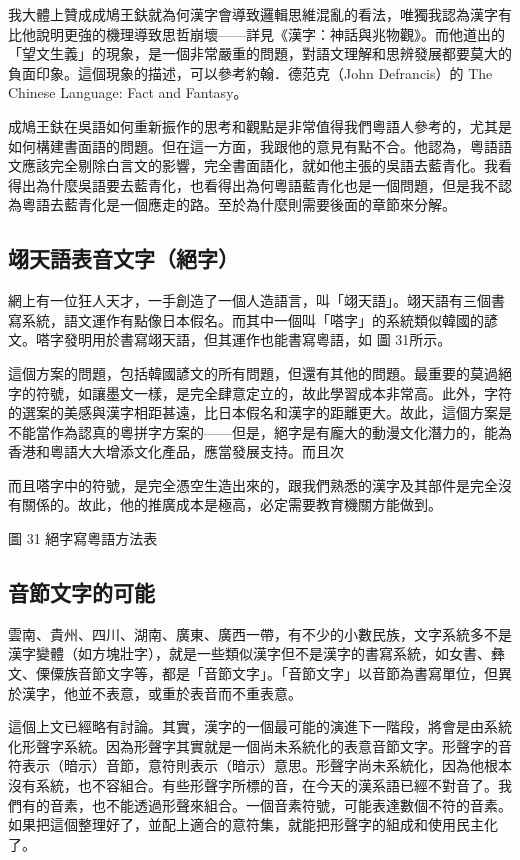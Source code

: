\documentclass[a5paper, 12pt, openany]{book} %
\begin{document}
我大體上贊成成鳩王鈇就為何漢字會導致邏輯思維混亂的看法，唯獨我認為漢字有比他說明更強的機理導致思哲崩壞——詳見《漢字：神話與兆物觀》。而他道出的「望文生義」的現象，是一個非常嚴重的問題，對語文理解和思辨發展都要莫大的負面印象。這個現象的描述，可以參考約翰．德范克（John Defrancis）的 The Chinese Language: Fact and Fantasy。

成鳩王鈇在吳語如何重新振作的思考和觀點是非常值得我們粵語人參考的，尤其是如何構建書面語的問題。但在這一方面，我跟他的意見有點不合。他認為，粵語語文應該完全剔除白言文的影響，完全書面語化，就如他主張的吳語去藍青化。我看得出為什麼吳語要去藍青化，也看得出為何粵語藍青化也是一個問題，但是我不認為粵語去藍青化是一個應走的路。至於為什麼則需要後面的章節來分解。

\subsection{翊天語表音文字（絕字）}

網上有一位狂人天才，一手創造了一個人造語言，叫「翊天語」。翊天語有三個書寫系統，語文運作有點像日本假名。而其中一個叫「嗒字」的系統類似韓國的諺文。嗒字發明用於書寫翊天語，但其運作也能書寫粵語，如 
圖 31所示。  

這個方案的問題，包括韓國諺文的所有問題，但還有其他的問題。最重要的莫過絕字的符號，如讓墨文一樣，是完全肆意定立的，故此學習成本非常高。此外，字符的選案的美感與漢字相距甚遠，比日本假名和漢字的距離更大。故此，這個方案是不能當作為認真的粵拼字方案的——但是，絕字是有龐大的動漫文化潛力的，能為香港和粵語大大增添文化產品，應當發展支持。而且次

而且嗒字中的符號，是完全憑空生造出來的，跟我們熟悉的漢字及其部件是完全沒有關係的。故此，他的推廣成本是極高，必定需要教育機關方能做到。

圖 31 絕字寫粵語方法表
\subsection{音節文字的可能}

雲南、貴州、四川、湖南、廣東、廣西一帶，有不少的小數民族，文字系統多不是漢字變體（如方塊壯字），就是一些類似漢字但不是漢字的書寫系統，如女書、彝文、傈僳族音節文字等，都是「音節文字」。「音節文字」以音節為書寫單位，但異於漢字，他並不表意，或重於表音而不重表意。

這個上文已經略有討論。其實，漢字的一個最可能的演進下一階段，將會是由系統化形聲字系統。因為形聲字其實就是一個尚未系統化的表意音節文字。形聲字的音符表示（暗示）音節，意符則表示（暗示）意思。形聲字尚未系統化，因為他根本沒有系統，也不容組合。有些形聲字所標的音，在今天的漢系語已經不對音了。我們有的音素，也不能透過形聲來組合。一個音素符號，可能表達數個不符的音素。如果把這個整理好了，並配上適合的意符集，就能把形聲字的組成和使用民主化了。
\end{document}

